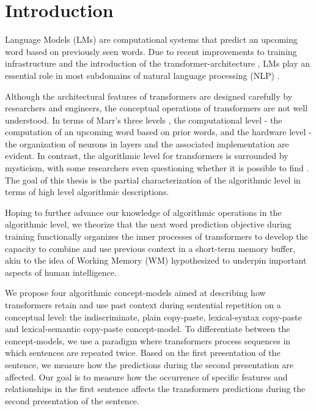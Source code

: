 \section{Introduction}

Language Models (LMs) are computational systems that predict an upcoming word based on previously seen words.
Due to recent improvements to training infrastructure and the introduction of the transformer-architecture \parencite{vaswani_attention_2017}, LMs play an essential role in most subdomains of natural language processing (NLP) \parencite{devlin_bert_2019,brown_language_2020}.

Although the architectural features of transformers are designed carefully by researchers and engineers, the conceptual operations of transformers are not well understood. %
In terms of Marr's three levels \parencite{marr_vision_1982}, the computational level - the computation of an upcoming word based on prior words, and the hardware level - the organization of neurons in layers and the associated implementation are evident.
In contrast, the algorithmic level for transformers is surrounded by mysticism, with some researchers even questioning whether it is possible to find \parencite{lillicrap_what_2019_correct}.
The goal of this thesis is the partial characterization of the algorithmic level in terms of high level algorithmic descriptions.

Hoping to further advance our knowledge of algorithmic operations in the algorithmic level, we theorize that the next word prediction objective during training functionally organizes the inner processes of transformers to develop the capacity to combine and use previous context in a short-term memory buffer, akin to the idea of Working Memory (WM) hypothesized to underpin important aspects of human intelligence.

We propose four algorithmic concept-models aimed at describing how transformers retain and use past context during sentential repetition on a conceptual level: the indiscriminate, plain copy-paste, lexical-syntax copy-paste and lexical-semantic copy-paste concept-model.
To differentiate between the concept-models, we use a paradigm where transformers process sequences in which sentences are repeated twice.
Based on the first presentation of the sentence, we measure how the predictions during the second presentation are affected.
Our goal is to measure how the occurrence of specific features and relationships in the first sentence affects the transformers predictions during the second presentation of the sentence.


